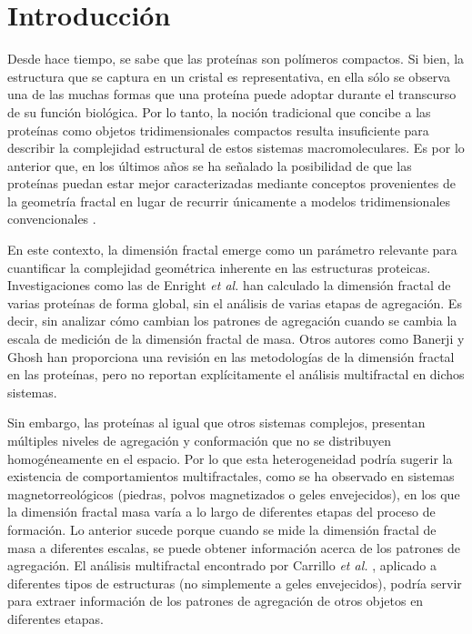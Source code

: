 \color{blue}

\chapter{Introducci\'{o}n}

Desde hace tiempo, se sabe que las prote\'{i}nas son pol\'{i}meros compactos. Si bien, la estructura que se captura en un cristal es representativa, en ella s\'{o}lo se observa una de las muchas formas que una prote\'{i}na puede adoptar durante el transcurso de su funci\'{o}n biol\'{o}gica. Por lo tanto, la noci\'{o}n tradicional que concibe a las prote\'{i}nas como objetos tridimensionales compactos resulta insuficiente para describir la complejidad estructural de estos sistemas macromoleculares. Es por lo anterior que, en los \'{u}ltimos años se ha señalado la posibilidad de que las prote\'{i}nas puedan estar mejor caracterizadas mediante conceptos provenientes de la geometr\'{i}a fractal en lugar de recurrir \'{u}nicamente a modelos tridimensionales convencionales \cite{Dewey1997, Mustafa1996, Vicsek1992 	, Cserzo1991}.

En este contexto, la dimensi\'{o}n fractal emerge como un par\'{a}metro relevante para cuantificar la complejidad geom\'{e}trica inherente en las estructuras proteicas. Investigaciones como las de Enright \textit{et al.} \cite{Enright2005} han calculado la dimensi\'{o}n fractal de varias prote\'{i}nas de forma global, sin el an\'{a}lisis de varias etapas de agregaci\'{o}n. Es decir, sin analizar c\'{o}mo cambian los patrones de agregaci\'{o}n cuando se cambia la escala de medici\'{o}n de la dimensi\'{o}n fractal de masa. Otros autores como Banerji y Ghosh \cite{Banerji2011} han proporciona una revisión en las metodologías de la dimensión fractal en las proteínas, pero no reportan explícitamente el análisis multifractal en dichos sistemas. 

Sin embargo, las prote\'{i}nas al igual que otros sistemas complejos, presentan m\'{u}ltiples niveles de agregaci\'{o}n y conformaci\'{o}n que no se distribuyen homog\'{e}neamente en el espacio. Por lo que esta heterogeneidad podr\'{i}a sugerir la existencia de comportamientos multifractales, como se ha observado en sistemas magnetorreol\'{o}gicos (piedras, polvos magnetizados o geles envejecidos), en los que la dimensi\'{o}n fractal masa var\'{i}a a lo largo de diferentes etapas del proceso de formaci\'{o}n. Lo anterior sucede porque cuando se mide la dimensi\'{o}n fractal de masa a diferentes escalas, se puede obtener informaci\'{o}n acerca de los patrones de agregaci\'{o}n. El an\'{a}lisis multifractal encontrado por Carrillo \textit{et al.} \cite{Carrillo2003}, aplicado a diferentes tipos de estructuras (no simplemente a geles envejecidos), podr\'{i}a servir para extraer informaci\'{o}n de los patrones de agregaci\'{o}n de otros objetos en diferentes etapas. 

